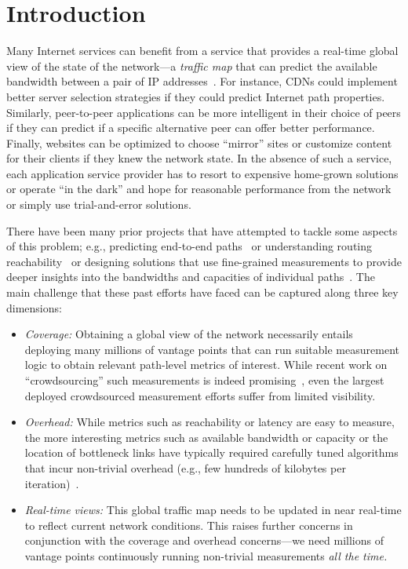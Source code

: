 \section{Introduction}

Many Internet services can benefit from a service that provides a real-time
global view of the state of the network---a {\em traffic map} that can predict
the available bandwidth between a pair of IP
addresses~\cite{clark2003knowledge,madhyastha2006iplane}. For instance, CDNs could implement
better server selection strategies if they could predict Internet path
properties.  Similarly, peer-to-peer applications can be more intelligent in
their choice of peers if they can predict if a specific alternative peer can
offer better performance.  Finally, websites can be optimized to choose
``mirror'' sites  or customize content for their clients if they knew the
network state.  In the absence of such a service, each application  service
provider has  to resort to expensive home-grown solutions or  operate ``in the
dark'' and hope for reasonable performance from the network or simply use
trial-and-error solutions.

 There have been many prior projects that have attempted to tackle some aspects
of this problem; e.g., predicting end-to-end paths~\cite{madhyastha2006iplane} or understanding routing reachability~\cite{katz2008studying} or designing solutions that use
fine-grained measurements to provide deeper insights into the bandwidths and
capacities of individual paths~\cite{pathneck}.  The main challenge that these
past efforts have faced can be captured along three key dimensions: 

\begin{itemize}

\item  {\em Coverage:} Obtaining a global view of the network necessarily entails deploying many millions of 
 vantage points that can run suitable measurement logic to obtain relevant path-level metrics of interest. 
 While recent work  on ``crowdsourcing'' such measurements is indeed promising~\cite{choffnes2010crowdsourcing,sanchez2013dasu,otto2011blind}, even the largest 
 deployed crowdsourced measurement efforts suffer from limited visibility.

\item {\em Overhead:}  While metrics such as reachability or latency are easy to measure,
 the more interesting metrics such as available bandwidth or capacity or the location 
 of bottleneck links have typically required carefully tuned algorithms that  incur 
 non-trivial overhead (e.g., few hundreds of kilobytes per iteration)~\cite{strauss2003measurement}.

\item {\em Real-time views:} This global 
traffic map needs to be updated in near real-time to reflect current network conditions. 
 This raises further concerns in conjunction with the coverage and overhead concerns---we need 
 millions of vantage points continuously running non-trivial measurements {\em all the time.}

\end{itemize} 


